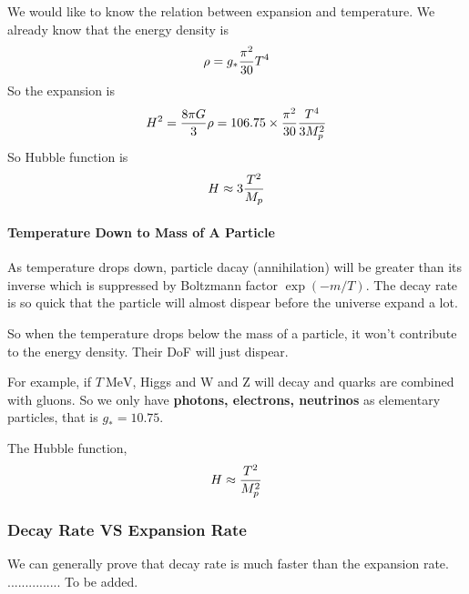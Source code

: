 \documentclass[letterpaper,10pt,english]{sphinxmanual}
\begin{document}
We would like to know the relation between expansion and temperature. We already know that the energy density is
\begin{gather}
\begin{split}\rho = g _ * \frac{\pi^2}{30} T^4\end{split}\notag
\end{gather}
So the expansion is
\begin{gather}
\begin{split}H^2 = \frac{8\pi G}{3}\rho = 106.75 \times \frac{\pi^2}{30} \frac{T^4}{3 M_p^2}\end{split}\notag
\end{gather}
So Hubble function is
\begin{gather}
\begin{split}H \approx 3 \frac{T^2}{M_p}\end{split}\notag
\end{gather}

\paragraph{Temperature Down to Mass of A Particle}
\label{Cosmology/cosmoIndex:temperature-down-to-mass-of-a-particle}
As temperature drops down, particle dacay (annihilation) will be greater than its inverse which is suppressed by Boltzmann factor \(\exp (-m/T)\). The decay rate is so quick that the particle will almost dispear before the universe expand a lot.

So when the temperature drops below the mass of a particle, it won't contribute to the energy density. Their DoF will just dispear.

For example, if \(T~\mathrm{MeV}\), Higgs and W and Z will decay and quarks are combined with gluons. So we only have \textbf{photons, electrons, neutrinos} as elementary particles, that is \(g_* = 10.75\).

The Hubble function,
\begin{gather}
\begin{split}H \approx \frac{T^2}{M _ p ^2}\end{split}\notag
\end{gather}

\subsubsection{Decay Rate VS Expansion Rate}
\label{Cosmology/cosmoIndex:decay-rate-vs-expansion-rate}
We can generally prove that decay rate is much faster than the expansion rate. ............... To be added.
\end{document}
